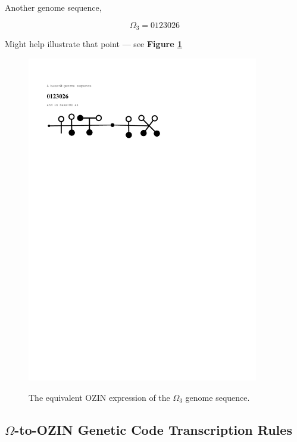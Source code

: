\documentclass[a4paper, 18pt]{book} %
\begin{document}
Another genome sequence, 

\begin{equation}
\label{EQDNEXA}
\Omega_{3} = 0123026
\end{equation}

Might help illustrate that point --- see \textbf{Figure \ref{FIGOZEXA}}


\begin{figure}[H]
  \begin{center}
   \includegraphics[trim=0cm 22cm 7cm 5cm, clip, width=0.9\textwidth,]{resources/pdfs/OZINCIPHER-APP3-EXA.pdf}\\
   \caption{The equivalent OZIN expression of the $\Omega_{3}$ genome sequence.}
  \label{FIGOZEXA}
  \end{center}
\end{figure}


\subsection{$\Omega$-to-OZIN Genetic Code Transcription Rules}
\end{document}
